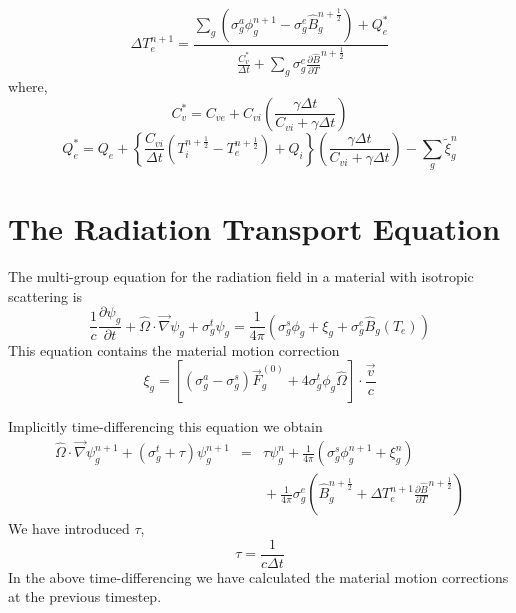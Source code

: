 \documentclass{article}
\newcommand{\partl}[2]{\ensuremath{\frac{\partial{#1}}{\partial{#2}}}}\newcommand{\del}{\ensuremath{\vec{\nabla}}}
\newcommand{\dt}{\ensuremath{\Delta t}}
\newcommand{\cviOdt}{\ensuremath{\frac{C_{vi}}{\dt}}}
\newcommand{\Cvs}{\ensuremath{C_{v}^{*}}}
\newcommand{\cvsOdt}{\ensuremath{\frac{\Cvs}{\dt}}}
\newcommand{\Bg}{\ensuremath{\hat{B}_{g}}}
\newcommand{\Bgnphlf}{\ensuremath{\hat{B}_{g}^{n+\frac{1}{2}}}}
\newcommand{\pBgnphlfdT}{\ensuremath{\frac{\partial\hat{B}}{\partial T}^{n+\frac{1}{2}}}}
\begin{document}
\begin{equation}
   \boxed{
        \Delta T_{e}^{n+1} =
                \frac{\sum_{g} \left( \sigma_{g}^{a} \phi_{g}^{n+1} 
                         - \sigma_{g}^{e} \Bgnphlf \right)
                         + Q_{e}^{*}}
                {\cvsOdt + \sum_{g} \sigma_{g}^{e} \pBgnphlfdT}
         }
\label{eq:Tenp1}
\end{equation}
where,
\begin{equation}
        \Cvs = C_{ve} + C_{vi} \left(\frac{\gamma\dt}{C_{vi}+\gamma\dt}\right)
\end{equation}
\begin{equation}
        Q_{e}^{*} = Q_{e} + \left\{ \cviOdt (T_{i}^{n+\frac{1}{2}} - T_{e}^{n+\frac{1}{2}}) +
                                Q_{i} \right\}
                \left(\frac{\gamma\dt}{C_{vi}+\gamma\dt}\right) -
                \sum_{g} \tilde{\xi}_{g}^{n}
\end{equation}

\section{The Radiation Transport Equation}

The multi-group equation for the radiation field in a material
with isotropic scattering is
\begin{equation}
        \frac{1}{c} \partl{\psi_{g}}{t}
        + \hat{\Omega} \cdot \del \psi_{g}
        + \sigma^{t}_{g} \psi_{g}
        = \frac{1}{4 \pi}
         \left( \sigma^{s}_{g} \phi_{g}
                + \xi_{g}
                + \sigma^{e}_{g} \Bg(T_{e})
         \right)
\label{eq:psi}
\end{equation}
This equation contains the material motion correction
\begin{equation}
        \xi_{g} = \left[ (\sigma^{a}_{g} - \sigma^{s}_{g}) \vec{F}^{(0)}_{g}
                + 4 \sigma^{t}_{g} \phi_{g} \hat{\Omega} \right]
                        \cdot \frac{\vec{v}}{c}
\label{eq:xi}
\end{equation}

Implicitly time-differencing this equation we obtain
\begin{eqnarray}
\hat{\Omega} \cdot \del \psi^{n+1}_{g} + (\sigma^{t}_{g} + \tau) \psi^{n+1}_{g}
        &=&  \tau \psi_{g}^{n}
         + \frac{1}{4\pi} \left( \sigma^{s}_{g} \phi^{n+1}_{g}
        + \xi_{g}^{n} \right)
  \nonumber \\
    & & \mbox{}
        + \frac{1}{4\pi} \sigma^{e}_{g} 
                \left(\Bgnphlf + \Delta T_{e}^{n+1} \pBgnphlfdT \right)
\label{eq:RadEq1}
\end{eqnarray}
We have introduced $\tau$,
\begin{equation}
        \tau = \frac{1}{c\dt}
\end{equation}
In the above time-differencing
we have calculated the material motion corrections at the previous timestep.
\end{document}
